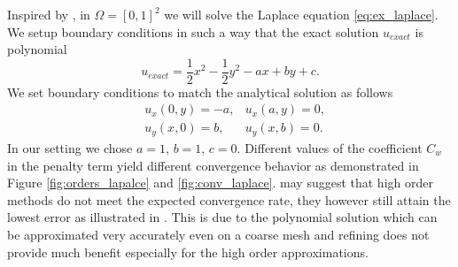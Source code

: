 \begin{example}[Diffusion 2D]
\label{ex:laplace}
Inspired by \cite[problem 8.4 (3), p. 150]{Holubova2011}, in $\Omega = [0, 1]^2$
we will solve the Laplace equation \eqref{eq:ex_laplace}.
We setup boundary conditions in such a way that the exact solution
$u_{exact}$ is polynomial
\begin{equation}
u_{exact} = \frac{1}{2}x^2 - \frac{1}{2}y^2 - ax + by + c.
\end{equation}
We set boundary conditions to match the analytical solution as follows
\begin{equation}
	\begin{aligned}
		&u_x(0, y) = -a, & u_x(a, y) = 0,\\
		&u_y(x, 0) = b, & u_y(x, b) = 0.
	\end{aligned}
\end{equation}
In our setting we chose $a=1$, $b=1$, $c=0$. Different values of
the coefficient $C_w$ in the penalty term yield different convergence behavior as demonstrated in
Figure \ref{fig:orders_lapalce} and \ref{fig:conv_laplace}. 
may suggest that high order methods do not meet the expected convergence rate, they however
still attain the lowest error as illustrated in . This is due to
the polynomial solution which can be approximated very accurately even on a coarse mesh and
refining does not provide much benefit especially for the high order approximations.
\end{example}

